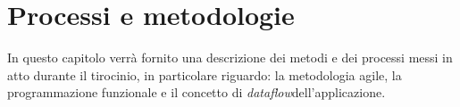 
\chapter{Processi e metodologie}
\label{cap:processi-metodologie}

In questo capitolo verrà fornito una descrizione dei metodi e dei processi messi in atto durante il tirocinio, in particolare riguardo: la metodologia agile, la programmazione funzionale e il concetto di \emph{dataflow}\glsfirstoccur dell'applicazione.


